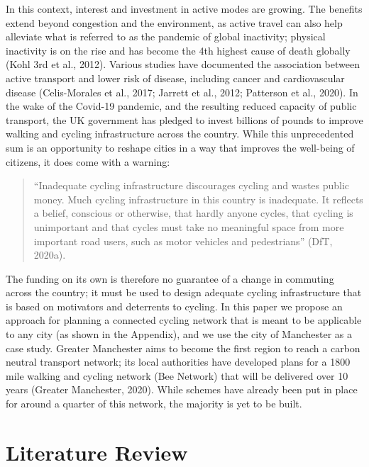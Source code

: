 \documentclass[
]{article}
\begin{document}
In this context, interest and investment in active modes are growing.
The benefits extend beyond congestion and the environment, as active
travel can also help alleviate what is referred to as the pandemic of
global inactivity; physical inactivity is on the rise and has become the
4th highest cause of death globally (Kohl 3rd et al., 2012). Various
studies have documented the association between active transport and
lower risk of disease, including cancer and cardiovascular disease
(Celis-Morales et al., 2017; Jarrett et al., 2012; Patterson et al., 2020). In the wake of the Covid-19 pandemic, and
the resulting reduced capacity of public transport, the UK government
has pledged to invest billions of pounds to improve walking and cycling
infrastructure across the country. While this unprecedented sum is an
opportunity to reshape cities in a way that improves the well-being of
citizens, it does come with a warning:

\begin{quote}
``Inadequate cycling infrastructure discourages cycling and wastes
public money. Much cycling infrastructure in this country is
inadequate. It reflects a belief, conscious or otherwise, that hardly
anyone cycles, that cycling is unimportant and that cycles must take
no meaningful space from more important road users, such as motor
vehicles and pedestrians'' (DfT, 2020a).
\end{quote}

The funding on its own is therefore no guarantee of a change in
commuting across the country; it must be used to design adequate cycling
infrastructure that is based on motivators and deterrents to cycling. In this paper we
propose an approach for planning a connected cycling network that is meant to
be applicable to any city (as shown in the Appendix), and we use the city of Manchester as a case study. Greater
Manchester aims to become the first region to reach a carbon neutral transport network;
its local authorities have developed plans for a 1800 mile walking and cycling network
(Bee Network) that will be delivered over 10 years (Greater Manchester, 2020). While schemes
have already been put in place for around a quarter of this network, the majority is yet to be built.

\hypertarget{literature-review}{%
\section{Literature Review}\label{literature-review}}
\end{document}
